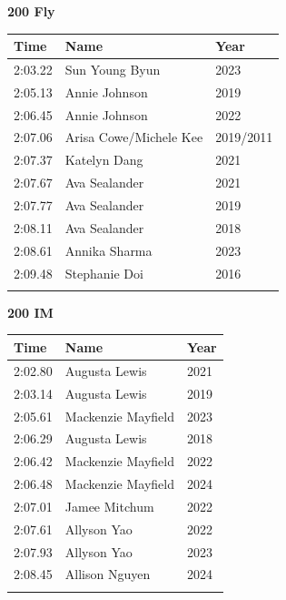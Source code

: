 \vspace{1.2em}
\noindent\begin{minipage}[t]{0.48\textwidth}
\centering
\textbf{\textcolor{teamprimary}{200 Fly}}\par
\vspace{0.5em}
\centering
\small
\renewcommand{\arraystretch}{1.0}
\setlength{\tabcolsep}{4pt}
\begin{tabular}{@{}p{1.8cm}p{3.0cm}p{1.0cm}@{}}
\toprule
\textbf{Time} & \textbf{Name} & \textbf{Year} \\
\midrule
2:03.22 & Sun Young Byun & 2023 \\
2:05.13 & Annie Johnson & 2019 \\
2:06.45 & Annie Johnson & 2022 \\
2:07.06 & Arisa Cowe/Michele Kee & 2019/2011 \\
2:07.37 & Katelyn Dang & 2021 \\
2:07.67 & Ava Sealander & 2021 \\
2:07.77 & Ava Sealander & 2019 \\
2:08.11 & Ava Sealander & 2018 \\
2:08.61 & Annika Sharma & 2023 \\
2:09.48 & Stephanie Doi & 2016 \\
\bottomrule
\vspace{0.5em}
\end{tabular}
\end{minipage}
\hfill
\begin{minipage}[t]{0.48\textwidth}
\centering
\textbf{\textcolor{teamprimary}{200 IM}}\par
\vspace{0.5em}
\centering
\small
\renewcommand{\arraystretch}{1.0}
\setlength{\tabcolsep}{4pt}
\begin{tabular}{@{}p{1.8cm}p{3.0cm}p{1.0cm}@{}}
\toprule
\textbf{Time} & \textbf{Name} & \textbf{Year} \\
\midrule
2:02.80 & Augusta Lewis & 2021 \\
2:03.14 & Augusta Lewis & 2019 \\
2:05.61 & Mackenzie Mayfield & 2023 \\
2:06.29 & Augusta Lewis & 2018 \\
2:06.42 & Mackenzie Mayfield & 2022 \\
2:06.48 & Mackenzie Mayfield & 2024 \\
2:07.01 & Jamee Mitchum & 2022 \\
2:07.61 & Allyson Yao & 2022 \\
2:07.93 & Allyson Yao & 2023 \\
2:08.45 & Allison Nguyen & 2024 \\
\bottomrule
\vspace{0.5em}
\end{tabular}
\end{minipage}
